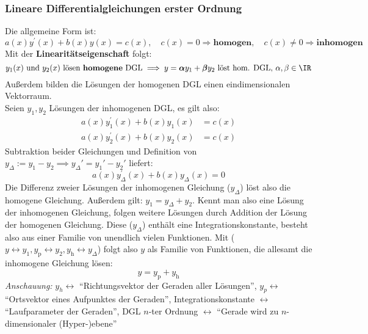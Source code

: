 \subsubsection{Lineare Differentialgleichungen erster Ordnung} \label{lin}
Die allgemeine Form ist:
\begin{equation}
	a(x)y^\prime (x)+b(x)y(x)=c(x), \quad c(x)=0\Rightarrow\textbf{homogen}, \quad c(x)\neq0\Rightarrow\textbf{inhomogen} 
\end{equation} 
Mit der \textbf{Linearitätseigenschaft} folgt:
\begin{equation}
		y_1(x) \text{ und } y_2(x) \text{ lösen \textbf{homogene} DGL}  \implies y=\bm{\alpha}y_1 + \bm{\beta}y_2 \text{ löst hom. DGL, } \alpha,\beta\in\IR
\end{equation}
Außerdem bilden die Lösungen der homogenen DGL einen eindimensionalen Vektorraum.\\
Seien $y_1,y_2$ Lösungen der inhomogenen DGL, es gilt also:
\begin{align*}
	a(x)y_1^\prime (x)+b(x)y_1(x)&=c(x)\\
	a(x)y_2^\prime (x)+b(x)y_2(x)&=c(x)
\end{align*}
Subtraktion beider Gleichungen und Definition von $y_\Delta:=y_1-y_2 \implies y_\Delta'=y_1'-y_2'$ liefert:
\begin{equation*}
	a(x)y_\Delta^\prime (x)+b(x)y_\Delta(x)=0
\end{equation*}
Die Differenz zweier Lösungen der inhomogenen Gleichung ($y_\Delta$) löst also die homogene Gleichung. Außerdem gilt: $y_1=y_\Delta+y_2$. Kennt man also eine Lösung der inhomogenen Gleichung, folgen weitere Lösungen durch Addition der Lösung der homogenen Gleichung. Diese ($y_\Delta$) enthält eine Integrationskonstante, besteht also aus einer Familie von unendlich vielen Funktionen. Mit ($y\leftrightarrow y_1, y_\text{p}\leftrightarrow y_2,y_\text{h}\leftrightarrow y_\Delta$) folgt also $y$ als Familie von Funktionen, die allesamt die inhomogene Gleichung lösen:
\begin{equation}
	y=y_\text{p}+y_\text{h}
\end{equation}
\textit{Anschauung:} $y_h\leftrightarrow$ \enquote{Richtungsvektor der Geraden aller Lösungen}, $y_p\leftrightarrow$ \enquote{Ortsvektor eines Aufpunktes der Geraden}, Integrationskonstante $\leftrightarrow$ \enquote{Laufparameter der Geraden}, DGL $n$-ter Ordnung $\leftrightarrow$ \enquote{Gerade wird zu $n$-dimensionaler (Hyper-)ebene}\\\\
